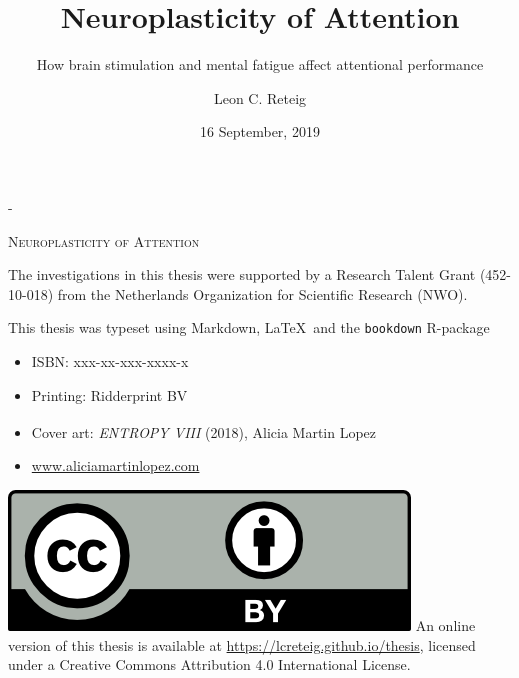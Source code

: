 \documentclass[11pt,english,]{memoir}
\title{Neuroplasticity of Attention}
\subtitle{How brain stimulation and mental fatigue affect attentional performance}
\author{Leon C. Reteig}
\date{16 September, 2019}
\newcommand{\CoverName}{cover} %
\begin{document}
\maketitle


\setlength{\abstitleskip}{-\absparindent}

\pagestyle{empty}
\renewcommand{\thepage}{\CoverName} %


\frontmatter
\pagestyle{empty} 
\def\drop{.1\textheight}
\newlength{\mylength}

\vspace*{\drop}
\calccentering{\mylength}
\begin{adjustwidth*}{\mylength}{-\mylength} %
\begin{center}
\Huge \textsc{Neuroplasticity of Attention}
\end{center}
\end{adjustwidth*}

\clearpage
\vspace*{\fill}
\begingroup %
\small
\setlength{\parskip}{\baselineskip} %
\setlength\parindent{0pt} %
The investigations in this thesis were supported by 
a Research Talent Grant (452-10-018)   
from 
the Netherlands Organization for Scientific Research (NWO).

This thesis was typeset using Markdown, \LaTeX\ and the \verb+bookdown+ R-package
\begin{itemize}[label={}, itemsep=0pt, partopsep=0pt, topsep=-\parskip, parsep=0pt, leftmargin=1em]
  \item ISBN: xxx-xx-xxx-xxxx-x  %
  \item Printing: Ridderprint BV 
  \item Cover art: \textit{ENTROPY VIII} (2018), Alicia Martin Lopez{\large\textsuperscript{\textcopyright}}
  \item \url{www.aliciamartinlopez.com}
\end{itemize}

\vspace{\baselineskip}
\includegraphics{_bookdown_files/CC-BY.png} \newline
An online version of this thesis is available at 
\url{https://lcreteig.github.io/thesis},
licensed under a 
Creative Commons Attribution 4.0 International License.
\endgroup
\end{document}
